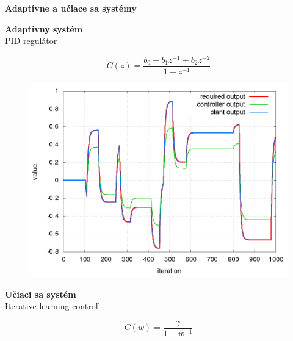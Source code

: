 \documentclass[xcolor=dvipsnames]{beamer}
\begin{document}
\begin{frame}{\bf Adaptívne a učiace sa systémy}
\begin{minipage}{.5\textwidth}
  {\bf Adaptívny systém} \\
  PID regulátor

  \begin{equation} \label{eu_eqn}
  C(z) = \frac{b_{0} + b_{1}z^{-1} + b_{2}z^{-2}}{1 - z^{-1}} \nonumber
  \end{equation}

  \begin{figure}[!htb]
  \includegraphics[scale=.15]{../pid_ilc/pid_result.png}
  \end{figure}

\end{minipage}%
\begin{minipage}{.5\textwidth}
  {\bf Učiaci sa systém} \\
  Iterative learning controll

  \begin{equation} \label{eu_eqn}
  C(w) = \frac{\gamma}{1 - w^{-1}} \nonumber
  \end{equation}


\end{minipage}
\end{frame}
\end{document}
